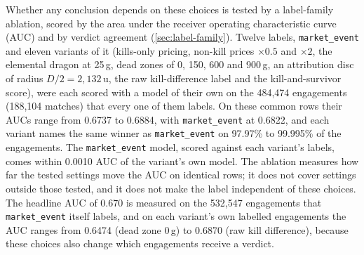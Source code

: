 Whether any conclusion depends on these choices is tested by a label-family ablation, scored by the
area under the receiver operating characteristic curve (AUC) and by verdict agreement
(\cref{sec:label-family}). Twelve labels, \texttt{market\_event} and eleven variants of it (kills-only
pricing, non-kill prices $\times 0.5$ and $\times 2$, the elemental dragon at 25\,g, dead zones of 0,
150, 600 and 900\,g, an attribution disc of radius $D/2 = 2{,}132$\,u, the raw kill-difference label and
the kill-and-survivor score), were each scored with a model of their own on the 484,474 engagements
(188,104 matches) that every one of them labels. On these common rows their AUCs range from 0.6737 to
0.6884, with \texttt{market\_event} at 0.6822, and each variant names the same winner as
\texttt{market\_event} on 97.97\% to 99.995\% of the engagements. The \texttt{market\_event} model,
scored against each variant's labels, comes within 0.0010 AUC of the variant's own model.
The ablation measures how far the tested settings move the AUC on identical rows; it does not cover
settings outside those tested, and it does not make the label independent of these choices. The headline AUC of 0.670 is measured on the 532,547 engagements that
\texttt{market\_event} itself labels, and on each variant's own labelled engagements the AUC ranges from
0.6474 (dead zone 0\,g) to 0.6870 (raw kill difference), because these choices also change which
engagements receive a verdict.

